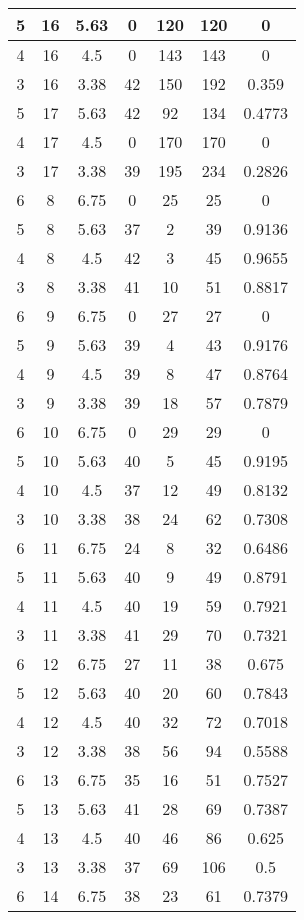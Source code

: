 \documentclass[letterpaper, 12pt]{article}
\begin{document}
\begin{longtable}{|c|c|c|c|c|c|c|}
\hline
5 & 16 & 5.63 & 0 & 120 & 120 & 0 \\
\hline
4 & 16 & 4.5 & 0 & 143 & 143 & 0 \\
\hline
3 & 16 & 3.38 & 42 & 150 & 192 & 0.359 \\
\hline
5 & 17 & 5.63 & 42 & 92 & 134 & 0.4773 \\
\hline
4 & 17 & 4.5 & 0 & 170 & 170 & 0 \\
\hline
3 & 17 & 3.38 & 39 & 195 & 234 & 0.2826 \\
\hline
6 & 8 & 6.75 & 0 & 25 & 25 & 0 \\
\hline
5 & 8 & 5.63 & 37 & 2 & 39 & 0.9136 \\
\hline
4 & 8 & 4.5 & 42 & 3 & 45 & 0.9655 \\
\hline
3 & 8 & 3.38 & 41 & 10 & 51 & 0.8817 \\
\hline
6 & 9 & 6.75 & 0 & 27 & 27 & 0 \\
\hline
5 & 9 & 5.63 & 39 & 4 & 43 & 0.9176 \\
\hline
4 & 9 & 4.5 & 39 & 8 & 47 & 0.8764 \\
\hline
3 & 9 & 3.38 & 39 & 18 & 57 & 0.7879 \\
\hline
6 & 10 & 6.75 & 0 & 29 & 29 & 0 \\
\hline
5 & 10 & 5.63 & 40 & 5 & 45 & 0.9195 \\
\hline
4 & 10 & 4.5 & 37 & 12 & 49 & 0.8132 \\
\hline
3 & 10 & 3.38 & 38 & 24 & 62 & 0.7308 \\
\hline
6 & 11 & 6.75 & 24 & 8 & 32 & 0.6486 \\
\hline
5 & 11 & 5.63 & 40 & 9 & 49 & 0.8791 \\
\hline
4 & 11 & 4.5 & 40 & 19 & 59 & 0.7921 \\
\hline
3 & 11 & 3.38 & 41 & 29 & 70 & 0.7321 \\
\hline
6 & 12 & 6.75 & 27 & 11 & 38 & 0.675 \\
\hline
5 & 12 & 5.63 & 40 & 20 & 60 & 0.7843 \\
\hline
4 & 12 & 4.5 & 40 & 32 & 72 & 0.7018 \\
\hline
3 & 12 & 3.38 & 38 & 56 & 94 & 0.5588 \\
\hline
6 & 13 & 6.75 & 35 & 16 & 51 & 0.7527 \\
\hline
5 & 13 & 5.63 & 41 & 28 & 69 & 0.7387 \\
\hline
4 & 13 & 4.5 & 40 & 46 & 86 & 0.625 \\
\hline
3 & 13 & 3.38 & 37 & 69 & 106 & 0.5 \\
\hline
6 & 14 & 6.75 & 38 & 23 & 61 & 0.7379 \\

\end{longtable}
\end{document}
